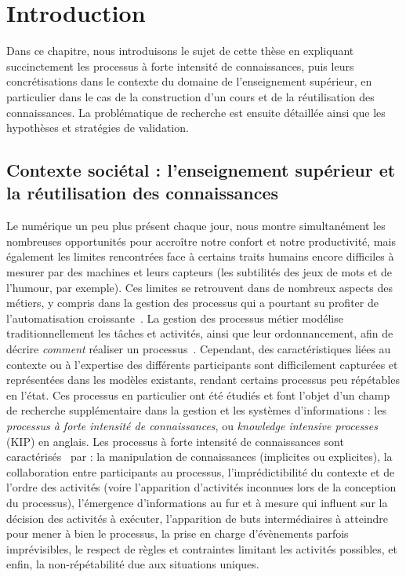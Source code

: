 \chapter{Introduction}
\label{chapter:Introduction}

Dans ce chapitre, nous introduisons le sujet de cette thèse en expliquant succinctement les processus à forte intensité de connaissances, puis leurs concrétisations dans le contexte du domaine de l'enseignement supérieur, en particulier dans le cas de la construction d'un cours et de la réutilisation des connaissances.
La problématique de recherche est ensuite détaillée ainsi que les hypothèses et stratégies de validation.


\bigskip

\minitoc %

\newpage

\section{Contexte sociétal : l'enseignement supérieur et la réutilisation des connaissances}
\label{section:Introduction:ContexteSocietal}

Le numérique un peu plus présent chaque jour, nous montre simultanément les nombreuses opportunités pour accroître notre confort et notre productivité, mais également les limites rencontrées face à certains traits humains encore difficiles à mesurer par des machines et leurs capteurs (les subtilités des jeux de mots et de l'humour, par exemple).
Ces limites se retrouvent dans de nombreux aspects des métiers, y compris dans la gestion des processus qui a pourtant su profiter de l'automatisation croissante~\cite{weske2007business}.
La gestion des processus métier modélise traditionnellement les tâches et activités, ainsi que leur ordonnancement, afin de décrire \textit{comment} réaliser un processus~\cite{kushnareva2016modelingFromGoalsToScenarios}.
Cependant, des caractéristiques liées au contexte ou à l'expertise des différents participants sont difficilement capturées et représentées dans les modèles existants, rendant certains processus peu répétables en l'état.
Ces processus en particulier ont été étudiés et font l'objet d'un champ de recherche supplémentaire dans la gestion et les systèmes d'informations : les \textit{processus à forte intensité de connaissances}, ou \textit{knowledge intensive processes} (KIP) en anglais.
Les processus à forte intensité de connaissances sont caractérisés~\cite{di2015knowledge} par : la manipulation de connaissances (implicites ou explicites), la collaboration entre participants au processus, l'imprédictibilité du contexte et de l'ordre des activités (voire l'apparition d'activités inconnues lors de la conception du processus), l'émergence d'informations au fur et à mesure qui influent sur la décision des activités à exécuter, l'apparition de buts intermédiaires à atteindre pour mener à bien le processus, la prise en charge d'évènements parfois imprévisibles, le respect de règles et contraintes limitant les activités possibles, et enfin, la non-répétabilité due aux situations uniques.

